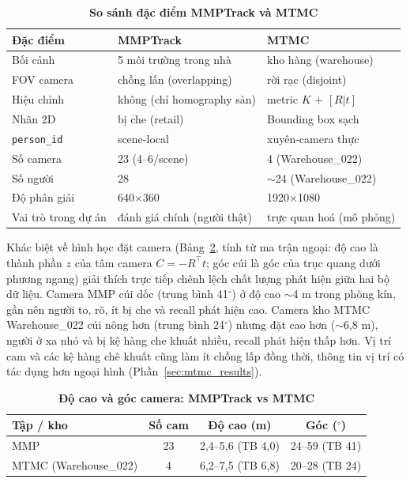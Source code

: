 \documentclass{article} %
\begin{document}
\begin{table}[H]
    \centering
    \caption[So sánh MMPTrack và MTMC]{\bfseries\fontsize{12pt}{0pt}\selectfont So sánh đặc điểm MMPTrack và MTMC}
    \begin{tabular}{|l|l|l|}
    \hline
    \bfseries Đặc điểm & \bfseries MMPTrack & \bfseries MTMC \\
    \hline
    Bối cảnh & 5 môi trường trong nhà & kho hàng (warehouse) \\
    FOV camera & chồng lấn (overlapping) & rời rạc (disjoint) \\
    Hiệu chỉnh & không (chỉ homography sàn) & metric $K$ + $[R|t]$ \\
    Nhãn 2D & bị che (retail) & Bounding box sạch \\
    \texttt{person\_id} & scene-local & xuyên-camera thực \\
    Số camera & 23 (4--6/scene) & 4 (Warehouse\_022) \\
    Số người & 28 & $\sim$24 (Warehouse\_022) \\
    Độ phân giải & 640$\times$360 & 1920$\times$1080 \\
    Vai trò trong dự án & đánh giá chính (người thật) & trực quan hoá (mô phỏng) \\
    \hline
    \end{tabular}
    \label{tab:mmp_vs_mtmc}
\end{table}

Khác biệt về hình học đặt camera (Bảng~\ref{tab:cam_geometry}, tính từ ma trận ngoại: độ cao là thành phần $z$ của tâm camera $C=-R^{\top}t$; góc cúi là góc của trục quang dưới phương ngang) giải thích trực tiếp chênh lệch chất lượng phát hiện giữa hai bộ dữ liệu. Camera MMP cúi dốc (trung bình 41$^\circ$) ở độ cao $\sim$4 m trong phòng kín, gần nên người to, rõ, ít bị che và recall phát hiện cao. Camera kho MTMC Warehouse\_022 cúi nông hơn (trung bình 24$^\circ$) nhưng đặt cao hơn ($\sim$6,8 m), người ở xa nhỏ và bị kệ hàng che khuất nhiều, recall phát hiện thấp hơn. Vị trí cam và các kệ hàng chê khuất cũng làm ít chồng lấp đồng thời, thông tin vị trí có tác dụng hơn ngoại hình (Phần~\ref{sec:mtmc_results}).

\begin{table}[H]
    \centering
    \caption[Hình học đặt camera MMP vs MTMC]{\bfseries\fontsize{12pt}{0pt}\selectfont Độ cao và góc camera: MMPTrack vs MTMC}
    \begin{tabular}{|l|c|c|c|}
    \hline
    \bfseries Tập / kho & \bfseries Số cam & \bfseries Độ cao (m) & \bfseries Góc ($^\circ$) \\
    \hline
    MMP & 23 & 2,4--5,6 (TB 4,0) & 24--59 (TB 41) \\
    MTMC (Warehouse\_022) & 4 & 6,2--7,5 (TB 6,8) & 20--28 (TB 24) \\
    \hline
    \end{tabular}
    \label{tab:cam_geometry}
\end{table}
\end{document}
